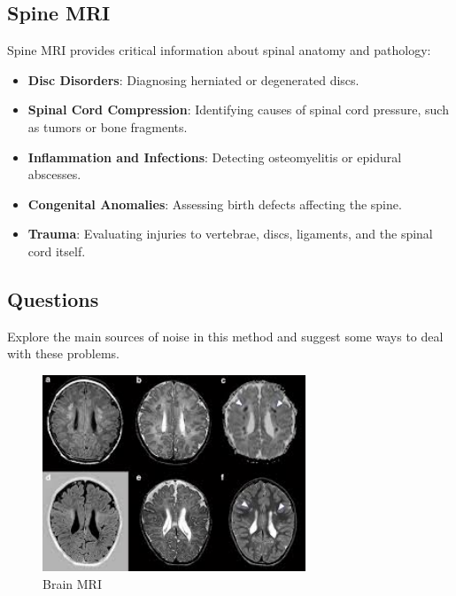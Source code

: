 \documentclass[hidelinks,12pt]{article}
\begin{document}
	\pagebreak
	
	\subsection{Spine MRI}
	Spine MRI provides critical information about spinal anatomy and pathology:
	\begin{itemize}
		\item \textbf{Disc Disorders}: Diagnosing herniated or degenerated discs.
		\item \textbf{Spinal Cord Compression}: Identifying causes of spinal cord pressure, such as tumors or bone fragments.
		\item \textbf{Inflammation and Infections}: Detecting osteomyelitis or epidural abscesses.
		\item \textbf{Congenital Anomalies}: Assessing birth defects affecting the spine.
		\item \textbf{Trauma}: Evaluating injuries to vertebrae, discs, ligaments, and the spinal cord itself.
	\end{itemize}
	
	\subsection{Questions}
	
	Explore the main sources of noise in this method and suggest some ways to deal with these problems.
	
	\vspace{2cm}
	
	\begin{figure}[h!]
		\centering
		\includegraphics[width=0.7\textwidth]{figures/pic4.jpeg} 
		\caption{Brain MRI}
	\end{figure}
	
	\pagebreak
	
	
	
\end{document}
